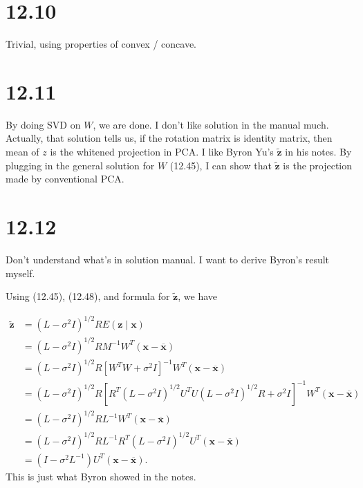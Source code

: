 \documentclass[12pt]{article}
\newcommand{\vect}[1]{\boldsymbol{#1}}
\begin{document}
\section{12.10} %
\label{sec:12_10}
Trivial, using properties of convex / concave.

\section{12.11} %
\label{sec:12_11}
By doing SVD on $W$, we are done. I don't like solution in the manual much. Actually, that solution tells us, if the rotation matrix is identity matrix, then mean of $z$ is the whitened projection in PCA. I like Byron Yu's $\tilde{\vect{z}}$ in his notes. By plugging in the general solution for $W$ (12.45), I can show that $\tilde{\vect{z}}$ is the projection made by conventional PCA.


\section{12.12} %
\label{sec:12_12}
Don't understand what's in solution manual. I want to derive Byron's result myself.

Using (12.45), (12.48), and formula for $\tilde{\vect{z}}$, we have

\begin{align}
\tilde{\vect{z}} & = (L-\sigma^2 I)^{1/2} R E(\vect{z}\mid \vect{x}) \\
                 & = (L-\sigma^2 I)^{1/2} R M^{-1} W^T (\vect{x} - \overline{\vect{x}} ) \\
                 & = (L-\sigma^2 I)^{1/2} R [   W^T W + \sigma^2 I    ]^{-1} W^T (\vect{x} - \overline{\vect{x}} ) \\
                 & = (L-\sigma^2 I)^{1/2} R [ R^T (L-\sigma^2 I)^{1/2} U^T U (L-\sigma^2 I)^{1/2} R + \sigma^2 I ]^{-1} W^T (\vect{x} - \overline{\vect{x}} ) \\
                 & = (L-\sigma^2 I)^{1/2} R L^{-1} W^T (\vect{x} - \overline{\vect{x}} ) \\
                 & = (L-\sigma^2 I)^{1/2} R L^{-1} R^T (L-\sigma^2 I)^{1/2} U^T (\vect{x} - \overline{\vect{x}} )\\
                 & =(I-\sigma^2 L^{-1}) U^T (\vect{x} - \overline{\vect{x}} ).
\end{align}
This is just what Byron showed in the notes.
\end{document}
